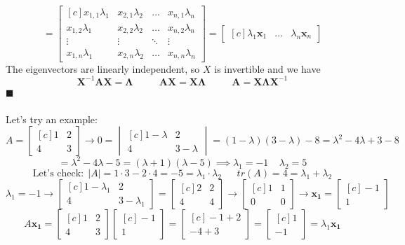 \documentclass{tufte-handout}
\renewcommand{\qedsymbol}{$\blacksquare$}
\begin{document}
\[
=
\begin{bmatrix*}[c]
x_{1,1}\lambda_1&x_{2,1}\lambda_2&\dots&x_{n,1}\lambda_n\\
x_{1,2}\lambda_1&x_{2,2}\lambda_2&\dots&x_{n,2}\lambda_n\\
\vdots&\vdots&\ddots&\vdots\\
x_{1,n}\lambda_1&x_{2,n}\lambda_2&\dots&x_{n,n}\lambda_n
\end{bmatrix*}
=
\begin{bmatrix*}[c]
\lambda_1\mathbf{x}_1&\dots&\lambda_n\mathbf{x}_n
\end{bmatrix*}
\]
The eigenvectors are linearly independent, so $X$ is invertible and we have
\[
\mathbf{X}^{-1}\mathbf{A}\mathbf{X}= \mathbf{\Lambda}
~~~~~~~~~~~~
\mathbf{A}\mathbf{X}= \mathbf{X}\mathbf{\Lambda}
~~~~~~~~~~~~
\mathbf{A}= \mathbf{X}\mathbf{\Lambda}\mathbf{X}^{-1}
\]
\noindent\qedsymbol\\\leavevmode\\
\noindent Let's try an example:\\\leavevmode
\[
A=
\begin{bmatrix*}[c] 1&2\\4&3 \end{bmatrix*}
\rightarrow
0=
\begin{vmatrix*}[c] 1-\lambda&2\\4&3-\lambda \end{vmatrix*}
=(1-\lambda)(3-\lambda)-8
=\lambda^2-4\lambda+3-8
\]
\[
=\lambda^2-4\lambda-5
=(\lambda+1)(\lambda-5)
\implies
\lambda_1=-1
~~~~~
\lambda_2=5
\]
\[
\text{Let's check:}~~
\vert A\vert=1\cdot3-2\cdot4=-5=\lambda_1\cdot\lambda_2
~~~~~~~
tr(A)=4=\lambda_1+\lambda_2
\]
\[
\lambda_1=-1
\rightarrow
\begin{bmatrix*}[c] 1-\lambda_1&2\\4&3-\lambda_1 \end{bmatrix*}
=
\begin{bmatrix*}[c] 2&2\\4&4 \end{bmatrix*}
\rightarrow
\begin{bmatrix*}[c] 1&1\\0&0 \end{bmatrix*}
\rightarrow
\mathbf{x_1}=
\begin{bmatrix*}[c] -1\\1 \end{bmatrix*}
\]
\[
A\mathbf{x_1}=
\begin{bmatrix*}[c] 1&2\\4&3 \end{bmatrix*}
\begin{bmatrix*}[c] -1\\1 \end{bmatrix*}
=
\begin{bmatrix*}[c] -1+2\\-4+3 \end{bmatrix*}
=
\begin{bmatrix*}[c] 1\\-1 \end{bmatrix*}
=\lambda_1\mathbf{x_1}
\]
\end{document}
